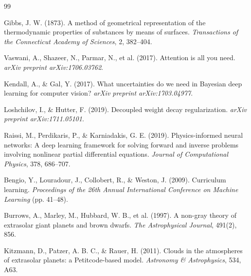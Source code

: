 \documentclass[12pt,a4paper,oneside]{report}
\begin{document}
\begin{thebibliography}{99}

 Gibbs, J. W. (1873). A method of geometrical representation of the thermodynamic properties of substances by means of surfaces. \textit{Transactions of the Connecticut Academy of Sciences}, 2, 382–404.

 Vaswani, A., Shazeer, N., Parmar, N., et al. (2017). Attention is all you need. \textit{arXiv preprint arXiv:1706.03762}.

 Kendall, A., \& Gal, Y. (2017). What uncertainties do we need in Bayesian deep learning for computer vision? \textit{arXiv preprint arXiv:1703.04977}.

 Loshchilov, I., \& Hutter, F. (2019). Decoupled weight decay regularization. \textit{arXiv preprint arXiv:1711.05101}.

 Raissi, M., Perdikaris, P., \& Karniadakis, G. E. (2019). Physics-informed neural networks: A deep learning framework for solving forward and inverse problems involving nonlinear partial differential equations. \textit{Journal of Computational Physics}, 378, 686–707.

 Bengio, Y., Louradour, J., Collobert, R., \& Weston, J. (2009). Curriculum learning. \textit{Proceedings of the 26th Annual International Conference on Machine Learning} (pp. 41–48).

 Burrows, A., Marley, M., Hubbard, W. B., et al. (1997). A non-gray theory of extrasolar giant planets and brown dwarfs. \textit{The Astrophysical Journal}, 491(2), 856.

 Kitzmann, D., Patzer, A. B. C., \& Rauer, H. (2011). Clouds in the atmospheres of extrasolar planets: a Petitcode-based model. \textit{Astronomy \& Astrophysics}, 534, A63.

\end{thebibliography}
\end{document}

